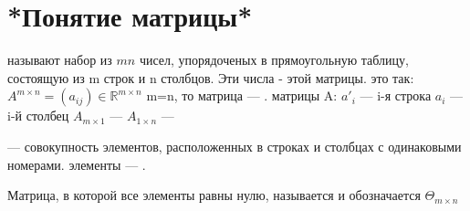 \chapter{*Понятие матрицы*}
\begin{opred}
 называют набор из $mn$ чисел, упорядоченых в прямоугольную таблицу, состоящую из m строк и n столбцов.
Эти числа -  этой матрицы.
 это так: $A^{m\times{}n}=\left( a_{ij} \right) \in \mathbb {R}^{m\times{}n}$
 m=n, то матрица --- .
 матрицы A:
\newline$a'_i$ --- i-я строка
\newline$a_i$ --- i-й столбец
\newline$A_{m\times{}1}$ --- 
\newline$A_{1\times{}n}$ --- 
\end{opred}
\begin{opred}
 --- совокупность элементов, расположенных в строках и столбцах с одинаковыми номерами.
 элементы --- .
\end{opred}
\begin{opred}
Матрица, в которой все элементы равны нулю, называется  и обозначается $\Theta_{m\times{}n}$
\end{opred}
